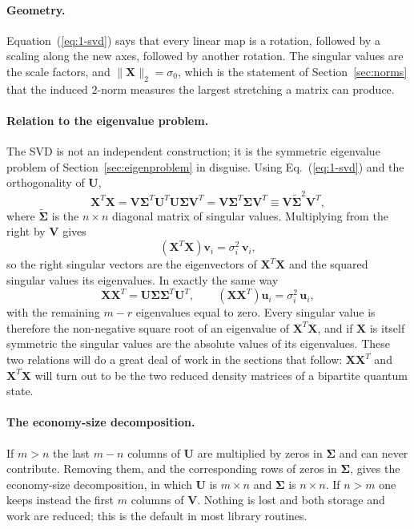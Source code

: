 \paragraph{Geometry.}
Equation~(\ref{eq:1-svd}) says that every linear map is a rotation, followed
by a scaling along the new axes, followed by another rotation.  The singular
values are the scale factors, and $\|\bm{X}\|_2=\sigma_0$, which is the
statement of Section~\ref{sec:norms} that the induced $2$-norm measures the
largest stretching a matrix can produce.

\paragraph{Relation to the eigenvalue problem.}
The SVD is not an independent construction; it is the symmetric eigenvalue
problem of Section~\ref{sec:eigenproblem} in disguise.  Using
Eq.~(\ref{eq:1-svd}) and the orthogonality of $\bm{U}$,
\begin{equation}
  \bm{X}^{T}\bm{X}
   = \bm{V}\bm{\Sigma}^{T}\bm{U}^{T}\bm{U}\bm{\Sigma}\bm{V}^{T}
   = \bm{V}\bm{\Sigma}^{T}\bm{\Sigma}\bm{V}^{T}
   \equiv \bm{V}\tilde{\bm{\Sigma}}^{2}\bm{V}^{T},
  \label{eq:1-xtx}
\end{equation}
where $\tilde{\bm{\Sigma}}$ is the $n\times n$ diagonal matrix of singular
values.  Multiplying from the right by $\bm{V}$ gives
\begin{equation}
  \left(\bm{X}^{T}\bm{X}\right)\bm{v}_i = \sigma_i^2\,\bm{v}_i ,
  \label{eq:1-righteigen}
\end{equation}
so the right singular vectors are the eigenvectors of $\bm{X}^{T}\bm{X}$ and
the squared singular values its eigenvalues.  In exactly the same way
\begin{equation}
  \bm{X}\bm{X}^{T} = \bm{U}\bm{\Sigma}\bm{\Sigma}^{T}\bm{U}^{T},
  \qquad
  \left(\bm{X}\bm{X}^{T}\right)\bm{u}_i = \sigma_i^2\,\bm{u}_i ,
  \label{eq:1-lefteigen}
\end{equation}
with the remaining $m-r$ eigenvalues equal to zero.  Every singular value is
therefore the non-negative square root of an eigenvalue of $\bm{X}^{T}\bm{X}$,
and if $\bm{X}$ is itself symmetric the singular values are the absolute
values of its eigenvalues.  These two relations will do a great deal of work
in the sections that follow: $\bm{X}\bm{X}^{T}$ and $\bm{X}^{T}\bm{X}$ will
turn out to be the two reduced density matrices of a bipartite quantum state.

\paragraph{The economy-size decomposition.}
If $m>n$ the last $m-n$ columns of $\bm{U}$ are multiplied by zeros in
$\bm{\Sigma}$ and can never contribute.  Removing them, and the corresponding
rows of zeros in $\bm{\Sigma}$, gives the economy-size decomposition, in which
$\bm{U}$ is $m\times n$ and $\bm{\Sigma}$ is $n\times n$.  If $n>m$ one keeps
instead the first $m$ columns of $\bm{V}$.  Nothing is lost and both storage
and work are reduced; this is the default in most library routines.

